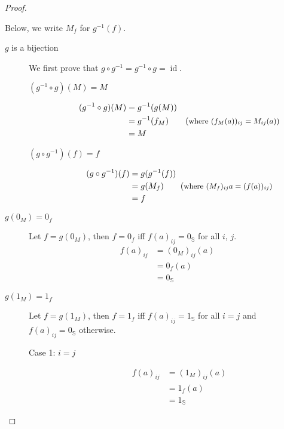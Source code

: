 \documentclass[runningheads]{llncs}
\DeclareMathOperator{\id}{id}
\begin{document}
\begin{proof}
\begin{description}
			Below, we write \(M_f\) for \(g^{-1}(f)\).
	\end{description}

	\begin{description}
		\item[\(g\) is a bijection]
			We first prove that \(g \circ g^{-1} = g^{-1} \circ g = \id\).
			\begin{description}
				\item[\((g^{-1} \circ g)(M) = M\)]
					\begin{align*}
						(g^{-1} \circ g)(M) & = g^{-1}(g(M))                                                  \\
						                    & = g^{-1}(f_M) \tag{\small{where \((f_M(a))_{ij} = M_{ij}(a)\)}} \\
						                    & = M
					\end{align*}

				\item[\((g \circ g^{-1})(f) = f\)]
					\begin{align*}
						(g \circ g^{-1})(f) & = g(g^{-1}(f))                                             \\
						                    & = g(M_f) \tag{\small{where \((M_f)_{ij}a = (f(a))_{ij}\)}} \\
						                    & = f
					\end{align*}
			\end{description}

		\item[\(g(0_M) = 0_f\)]
			Let \(f = g(0_M)\), then \(f = 0_f\) iff \(f(a)_{ij} = 0_{\mathbb{S}}\) for all \(i\), \(j\).
			\begin{align*}
				f(a)_{ij} & = (0_M)_{ij}(a)                           \\
				          & = 0_f(a)\tag{by def. of \(0_M\)}          \\
				          & = 0_{\mathbb{S}} \tag{by def. of \(0_f\)}
			\end{align*}

		\item[\(g(1_M) = 1_f\)]
			Let \(f = g(1_M)\), then \(f = 1_f\) iff \(f(a)_{ij} = 1_{\mathbb{S}} \) for all \(i=j\) and \(f(a)_{ij} = 0_{\mathbb{S}} \) otherwise.
			\begin{description}
				\item[Case 1: \(i = j\)]
					\begin{align*}
						f(a)_{ij} & = (1_M)_{ij}(a)                           \\
						          & = 1_f(a)\tag{by def. of \(1_M\)}          \\
						          & = 1_{\mathbb{S}} \tag{by def. of \(1_f\)}
					\end{align*}


\end{description}
\end{description}
\end{proof}
\end{document}
